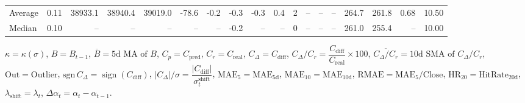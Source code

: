 \begin{threeparttable}
{\begin{tabular}{lrrrrrrrrrrrrrrrrr}
Average &     0.11 & 38933.1 & 38940.4 & 39019.0 &      -78.6 &           -0.2 &                      -0.3 &                     -0.3 &                 0.4 &              2 &         -- &        -- &             -- &            264.7 &               261.8 &            0.68 &                  10.50 \\
 Median &     0.10 &      -- &      -- &      -- &         -- &             -- &                      -0.2 &                       -- &                  -- &              0 &         -- &        -- &             -- &            261.0 &               255.4 &              -- &                  10.00 \\
\bottomrule
\end{tabular}
}
\begin{tablenotes}\footnotesize
\item $\kappa=\kappa(\sigma)$, $B=B_{t-1}$, $\overline{B}=\text{5d MA of }B$, $C_p=C_{\text{pred}}$, $C_r=C_{\text{real}}$, $C_\Delta=C_{\text{diff}}$, $C_\Delta/C_r=\dfrac{C_{\text{diff}}}{C_{\text{real}}}\times100$, $\overline{C_\Delta/C_r}=\text{10d SMA of }C_\Delta/C_r$, $\mathrm{Out}=\text{Outlier}$, $\mathrm{sgn}\,C_\Delta=\operatorname{sign}(C_{\text{diff}})$, $|C_\Delta|/\sigma=\dfrac{|C_{\text{diff}}|}{\sigma_t^{\text{shift}}}$, $\mathrm{MAE}_5=\mathrm{MAE}_{5\text{d}}$, $\mathrm{MAE}_{10}=\mathrm{MAE}_{10\text{d}}$, $\mathrm{RMAE}= \mathrm{MAE}_5 / \text{Close}$, $\mathrm{HR}_{20}=\mathrm{HitRate}_{20\text{d}}$, $\lambda_{\text{shift}}=\lambda_t$, $\Delta\alpha_t=\alpha_t-\alpha_{t-1}$.
\end{tablenotes}
\end{threeparttable}
\endgroup

